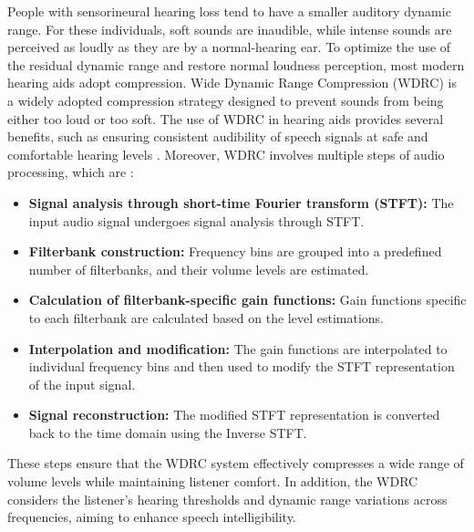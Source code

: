 People with sensorineural hearing loss tend to have a smaller auditory dynamic range. For these individuals, soft sounds are inaudible, while intense sounds are perceived as loudly as they are by a normal-hearing ear. To optimize the use of the residual dynamic range and restore normal loudness perception, most modern hearing aids adopt compression. Wide Dynamic Range Compression (WDRC) \cite{WDRCbenefit1} is a widely adopted compression strategy designed to prevent sounds from being either too loud or too soft. The use of WDRC in hearing aids provides several benefits, such as ensuring consistent audibility of speech signals at safe and comfortable hearing levels \cite{WDRCbenefit1}. Moreover, WDRC involves multiple steps of audio processing, which are \cite{WDRCblock}:

\begin{itemize}
\item \textbf{Signal analysis through short-time Fourier transform (STFT):} The input audio signal undergoes signal analysis through STFT.

\item \textbf{Filterbank construction:} Frequency bins are grouped into a predefined number of filterbanks, and their volume levels are estimated.

\item \textbf{Calculation of filterbank-specific gain functions:} Gain functions specific to each filterbank are calculated based on the level estimations. 

\item \textbf{Interpolation and modification:} The gain functions are interpolated to individual frequency bins and then used to modify the STFT representation of the input signal. 

\item \textbf{Signal reconstruction:} The modified STFT representation is converted back to the time domain using the Inverse STFT.
\end{itemize}

These steps ensure that the WDRC system effectively compresses a wide range of volume levels while maintaining listener comfort. In addition, the WDRC considers the listener's hearing thresholds and dynamic range variations across frequencies, aiming to enhance speech intelligibility.